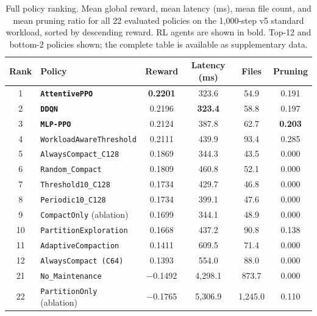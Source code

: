 \documentclass[fleqn,10pt]{wlscirep}
\newcommand{\attentive}{\texttt{AttentivePPO}}
\newcommand{\mlpppo}{\texttt{MLP-PPO}}
\newcommand{\ddqn}{\texttt{DDQN}}
\begin{document}
\begin{table}[!htbp]
\centering
\setlength{\tabcolsep}{5pt}
\begin{tabular}{clcccc}
\toprule
\textbf{Rank} & \textbf{Policy} & \textbf{Reward} &
  \textbf{Latency (ms)} & \textbf{Files} & \textbf{Pruning} \\
\midrule
1  & \textbf{\attentive{}}           & \textbf{0.2201} & 323.6           & 54.9   & 0.191 \\
2  & \textbf{\ddqn{}}                & 0.2196          & \textbf{323.4}  & 58.8   & 0.197 \\
3  & \textbf{\mlpppo{}}              & 0.2124          & 387.8           & 62.7   & \textbf{0.203} \\
4  & \texttt{WorkloadAwareThreshold} & 0.2111          & 439.9           & 93.4   & 0.285 \\
5  & \texttt{AlwaysCompact\_C128}    & 0.1869          & 344.3           & 43.5   & 0.000 \\
6  & \texttt{Random\_Compact}        & 0.1809          & 460.8           & 52.1   & 0.000 \\
7  & \texttt{Threshold10\_C128}      & 0.1734          & 429.7           & 46.8   & 0.000 \\
8  & \texttt{Periodic10\_C128}       & 0.1734          & 399.1           & 47.6   & 0.000 \\
9  & \texttt{CompactOnly} (ablation) & 0.1699          & 344.1           & 48.9   & 0.000 \\
10 & \texttt{PartitionExploration}   & 0.1668          & 437.2           & 90.8   & 0.138 \\
11 & \texttt{AdaptiveCompaction}     & 0.1411          & 609.5           & 71.4   & 0.000 \\
12 & \texttt{AlwaysCompact (C64)}    & 0.1393          & 554.0           & 88.0   & 0.000 \\
\midrule
21 & \texttt{No\_Maintenance}        & $-$0.1492       & 4,298.1         & 873.7  & 0.000 \\
22 & \texttt{PartitionOnly} (ablation)& $-$0.1765      & 5,306.9         & 1,245.0 & 0.110 \\
\bottomrule
\end{tabular}
\caption{\label{tab:ranking}Full policy ranking. Mean global reward, mean latency (ms),
  mean file count, and mean pruning ratio for all 22 evaluated policies
  on the 1,000-step v5 standard workload, sorted by descending reward.
  RL agents are shown in bold. Top-12 and bottom-2 policies shown;
  the complete table is available as supplementary data.}
\end{table}
\end{document}
